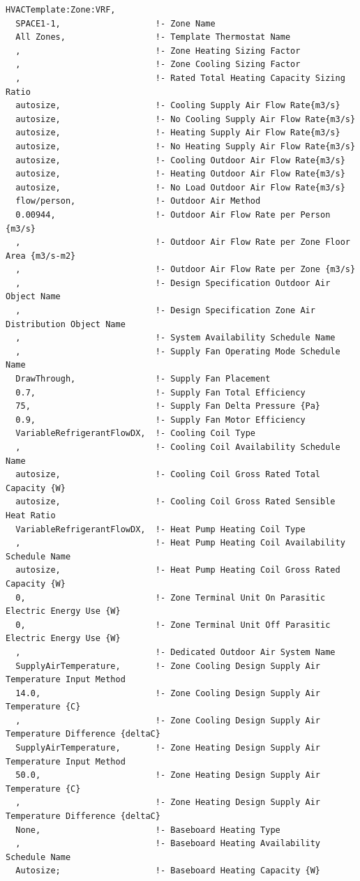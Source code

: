 \begin{lstlisting}
HVACTemplate:Zone:VRF,
  SPACE1-1,                   !- Zone Name
  All Zones,                  !- Template Thermostat Name
  ,                           !- Zone Heating Sizing Factor
  ,                           !- Zone Cooling Sizing Factor
  ,                           !- Rated Total Heating Capacity Sizing Ratio
  autosize,                   !- Cooling Supply Air Flow Rate{m3/s}
  autosize,                   !- No Cooling Supply Air Flow Rate{m3/s}
  autosize,                   !- Heating Supply Air Flow Rate{m3/s}
  autosize,                   !- No Heating Supply Air Flow Rate{m3/s}
  autosize,                   !- Cooling Outdoor Air Flow Rate{m3/s}
  autosize,                   !- Heating Outdoor Air Flow Rate{m3/s}
  autosize,                   !- No Load Outdoor Air Flow Rate{m3/s}
  flow/person,                !- Outdoor Air Method
  0.00944,                    !- Outdoor Air Flow Rate per Person {m3/s}
  ,                           !- Outdoor Air Flow Rate per Zone Floor Area {m3/s-m2}
  ,                           !- Outdoor Air Flow Rate per Zone {m3/s}
  ,                           !- Design Specification Outdoor Air Object Name
  ,                           !- Design Specification Zone Air Distribution Object Name
  ,                           !- System Availability Schedule Name
  ,                           !- Supply Fan Operating Mode Schedule Name
  DrawThrough,                !- Supply Fan Placement
  0.7,                        !- Supply Fan Total Efficiency
  75,                         !- Supply Fan Delta Pressure {Pa}
  0.9,                        !- Supply Fan Motor Efficiency
  VariableRefrigerantFlowDX,  !- Cooling Coil Type
  ,                           !- Cooling Coil Availability Schedule Name
  autosize,                   !- Cooling Coil Gross Rated Total Capacity {W}
  autosize,                   !- Cooling Coil Gross Rated Sensible Heat Ratio
  VariableRefrigerantFlowDX,  !- Heat Pump Heating Coil Type
  ,                           !- Heat Pump Heating Coil Availability Schedule Name
  autosize,                   !- Heat Pump Heating Coil Gross Rated Capacity {W}
  0,                          !- Zone Terminal Unit On Parasitic Electric Energy Use {W}
  0,                          !- Zone Terminal Unit Off Parasitic Electric Energy Use {W}
  ,                           !- Dedicated Outdoor Air System Name
  SupplyAirTemperature,       !- Zone Cooling Design Supply Air Temperature Input Method
  14.0,                       !- Zone Cooling Design Supply Air Temperature {C}
  ,                           !- Zone Cooling Design Supply Air Temperature Difference {deltaC}
  SupplyAirTemperature,       !- Zone Heating Design Supply Air Temperature Input Method
  50.0,                       !- Zone Heating Design Supply Air Temperature {C}
  ,                           !- Zone Heating Design Supply Air Temperature Difference {deltaC}
  None,                       !- Baseboard Heating Type
  ,                           !- Baseboard Heating Availability Schedule Name
  Autosize;                   !- Baseboard Heating Capacity {W}
\end{lstlisting}

